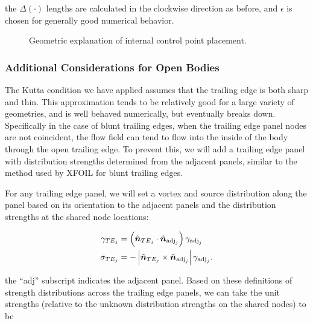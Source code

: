 \where the \(\Delta (\cdot)\) lengths are calculated in the clockwise direction as before, and \(\epsilon\) is chosen for generally good numerical behavior.

\begin{figure}
    \centering
    
    \caption{Geometric explanation of internal control point placement.}
    \label{fig:pseudocplocation}
\end{figure}

\subsubsection{Additional Considerations for Open Bodies}

The Kutta condition we have applied assumes that the trailing edge is both sharp and thin.
%
This approximation tends to be relatively good for a large variety of geometries, and is well behaved numerically, but eventually breaks down.
%
Specifically in the case of blunt trailing edges, when the trailing edge panel nodes are not coincident, the flow field can tend to flow into the inside of the body through the open trailing edge.
%
To prevent this, we will add a trailing edge panel with distribution strengths determined from the adjacent panels, similar to the method used by XFOIL for blunt trailing edges.

For any trailing edge panel, we will set a vortex and source distribution along the panel based on its orientation to the adjacent panels and the distribution strengths at the shared node locations:

\begin{align}
    \gamma_{TE_j} &= \left(\hat{\vect{n}}_{TE_j} \cdot \hat{\vect{n}}_{\text{adj}_j}\right)\gamma_{\text{adj}_j} \\ %
    \sigma_{TE_j} &= -\left|\hat{\vect{n}}_{TE_j} \times \hat{\vect{n}}_{\text{adj}_j}\right|\gamma_{\text{adj}_j}. %
\end{align}

\where the ``adj'' subscript indicates the adjacent panel.
%
Based on these definitions of strength distributions across the trailing edge panels, we can take the unit strengths (relative to the unknown distribution strengths on the shared nodes) to be

